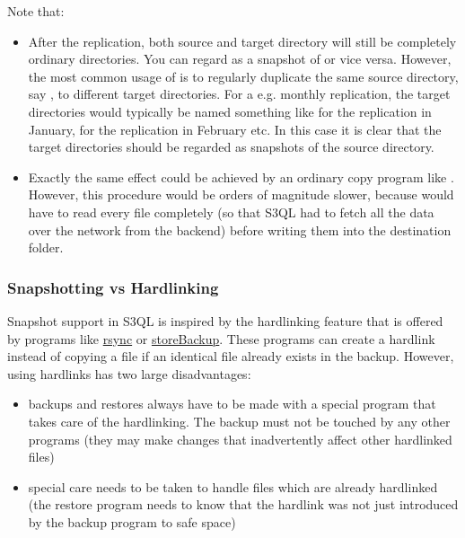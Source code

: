 \documentclass[letterpaper,10pt,english]{sphinxmanual}
\begin{document}
Note that:
\begin{itemize}
\item {} 
After the replication, both source and target directory will still
be completely ordinary directories. You can regard  as a
snapshot of  or vice versa. However, the most common
usage of  is to regularly duplicate the same source
directory, say , to different target directories. For a
e.g. monthly replication, the target directories would typically be
named something like  for the replication in
January,  for the replication in February etc.
In this case it is clear that the target directories should be
regarded as snapshots of the source directory.

\item {} 
Exactly the same effect could be achieved by an ordinary copy
program like . However, this procedure would be orders of
magnitude slower, because  would have to read every file
completely (so that S3QL had to fetch all the data over the network
from the backend) before writing them into the destination folder.

\end{itemize}


\subsubsection{Snapshotting vs Hardlinking}
\label{man/cp:snapshotting-vs-hardlinking}
Snapshot support in S3QL is inspired by the hardlinking feature that
is offered by programs like \href{http://www.samba.org/rsync}{rsync} or
\href{http://savannah.nongnu.org/projects/storebackup}{storeBackup}.
These programs can create a hardlink instead of copying a file if an
identical file already exists in the backup. However, using hardlinks
has two large disadvantages:
\begin{itemize}
\item {} 
backups and restores always have to be made with a special program
that takes care of the hardlinking. The backup must not be touched
by any other programs (they may make changes that inadvertently
affect other hardlinked files)

\item {} 
special care needs to be taken to handle files which are already
hardlinked (the restore program needs to know that the hardlink was
not just introduced by the backup program to safe space)

\end{itemize}
\end{document}
